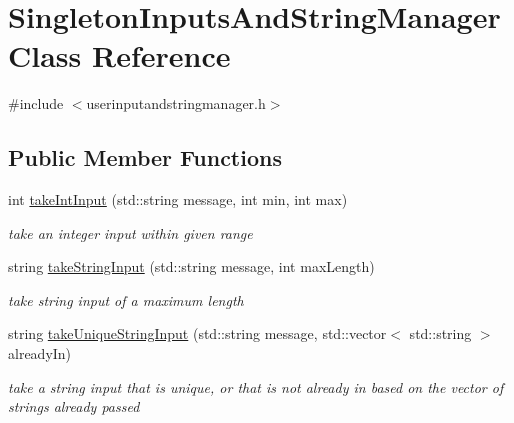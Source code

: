 \hypertarget{class_singleton_inputs_and_string_manager}{}\section{Singleton\+Inputs\+And\+String\+Manager Class Reference}
\label{class_singleton_inputs_and_string_manager}


{\ttfamily \#include $<$userinputandstringmanager.\+h$>$}

\subsection*{Public Member Functions}
\begin{DoxyCompactItemize}
\item 
\hypertarget{class_singleton_inputs_and_string_manager_adafcb280bc2f799f4e3bf1021140e999}{}\label{class_singleton_inputs_and_string_manager_adafcb280bc2f799f4e3bf1021140e999} 
int \hyperlink{class_singleton_inputs_and_string_manager_adafcb280bc2f799f4e3bf1021140e999}{take\+Int\+Input} (std\+::string message, int min, int max)
\begin{DoxyCompactList}\small\item\em take an integer input within given range \end{DoxyCompactList}\item 
\hypertarget{class_singleton_inputs_and_string_manager_a8e0fe268b8ef24591d7dad4dbf26115d}{}\label{class_singleton_inputs_and_string_manager_a8e0fe268b8ef24591d7dad4dbf26115d} 
string \hyperlink{class_singleton_inputs_and_string_manager_a8e0fe268b8ef24591d7dad4dbf26115d}{take\+String\+Input} (std\+::string message, int max\+Length)
\begin{DoxyCompactList}\small\item\em take string input of a maximum length \end{DoxyCompactList}\item 
\hypertarget{class_singleton_inputs_and_string_manager_af1d0e4d486469f7f85d8e0e592345977}{}\label{class_singleton_inputs_and_string_manager_af1d0e4d486469f7f85d8e0e592345977} 
string \hyperlink{class_singleton_inputs_and_string_manager_af1d0e4d486469f7f85d8e0e592345977}{take\+Unique\+String\+Input} (std\+::string message, std\+::vector$<$ std\+::string $>$ already\+In)
\begin{DoxyCompactList}\small\item\em take a string input that is unique, or that is not already in based on the vector of strings already passed \end{DoxyCompactList}\item 

\end{DoxyCompactItemize}
